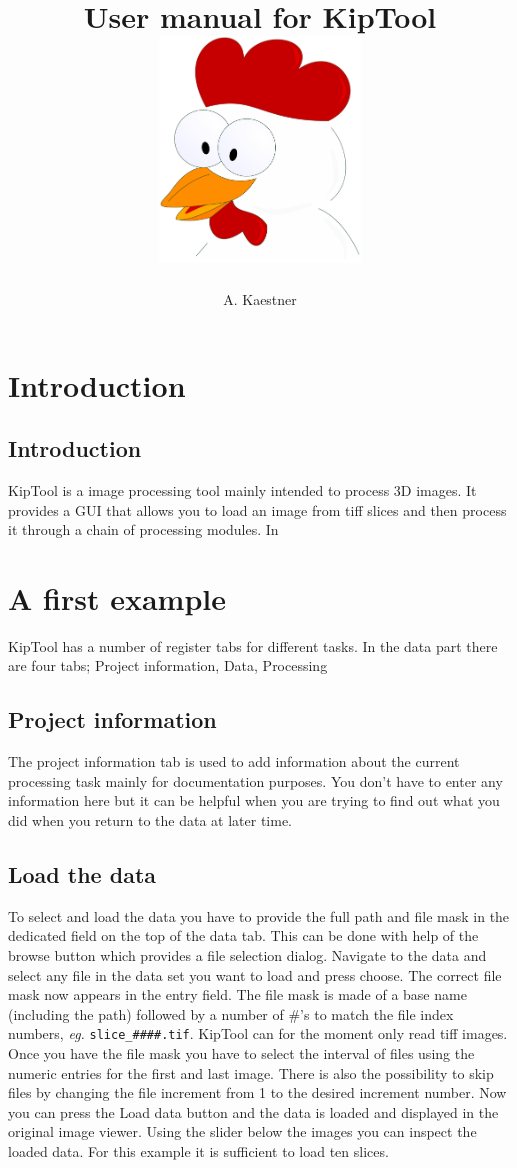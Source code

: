 \documentclass[a4paper]{scrreprt}
\title{User manual for KipTool\\\vskip30pt\includegraphics[width=0.4\textwidth]{figures/kip_icon.pdf}}
\author{A. Kaestner}
\begin{document}
\maketitle
\tableofcontents
\chapter{Introduction}
\section{Introduction}
KipTool is a image processing tool mainly intended to process 3D images. It provides a GUI that allows you to load an image from tiff slices and then process it through a chain of processing modules. In 
\chapter{A first example}
KipTool has a number of register tabs for different tasks. In the data part there are four tabs; Project information, Data, Processing
\section{Project information}
The project information tab is used to add information about the current processing task mainly for documentation purposes. You don't have to enter any information here but it can be helpful when you are trying to find out what you did when you return to the data at later time.

\section{Load the data}
To select and load the data you have to provide the full path and file mask in the dedicated field on the top of the data tab. This can be done with help of the browse button which provides a file selection dialog. Navigate to the data and select any file in the data set you want to load and press choose. The correct file mask now appears in the entry field. The file mask is made of a base name (including the path) followed by a number of \#'s to match the file index numbers, \emph{eg.} \verb+slice_####.tif+. KipTool can for the moment only read tiff images. Once you have the file mask you have to select the interval of files using the numeric entries for the first and last image. There is also the possibility to skip files by changing the file increment from 1 to the desired increment number. Now you can press the Load data button and the data is loaded and displayed in the original image viewer. Using the slider below the images you can inspect the loaded data. For this example it is sufficient to load ten slices. 
\end{document}
